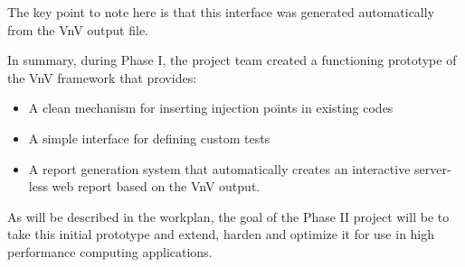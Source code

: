 The key point to note here is that this interface was generated automatically from the VnV output file.

In summary, during Phase I, the project team created a functioning prototype of the VnV framework that provides:
\begin{itemize}
 \item A clean mechanism for inserting injection points in existing codes
 \item A simple interface for defining custom tests 
 \item A report generation system that automatically creates an interactive server-less web report based on the VnV output.
\end{itemize}

As will be described in the workplan, the goal of the Phase II project will be to take this initial prototype and extend, harden and 
optimize it for use in high performance computing applications. 





























